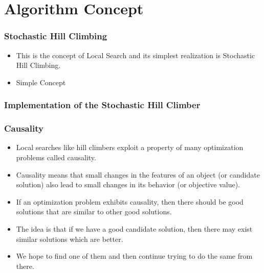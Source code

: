 \documentclass[mathserif]{beamer}%
\begin{document}
\section{Algorithm Concept}%
%
\begin{frame}[t]%
\frametitle{Stochastic Hill Climbing}%
\begin{itemize}%
\item This is the concept of \alert{Local Search}\cite{WGOEB,HS2005SLSFAA,RN2002AI,S2003ITSSAO} and its simplest realization is \alert{Stochastic Hill Climbing}\cite{WGOEB}.%
\item<2-> Simple Concept%
\end{itemize}%
%
\end{frame}%
%
\begin{frame}%
\frametitle{Implementation of the Stochastic Hill Climber}%
%
\end{frame}%
%
\begin{frame}%
\frametitle{Causality}%
\begin{itemize}%
\item Local searches like hill climbers exploit a property of many optimization problems called \alert{causality}\cite{R1973ES,R1994ES,WCT2012EOPABT,WZCN2009WIOD}.%
\item<2-> Causality means that small changes in the features of an object (or candidate solution) also lead to small changes in its behavior (or objective value).%
\item<3-> If an optimization problem exhibits causality, then there should be good solutions that are similar to other good solutions.%
\item<4-> The idea is that if we have a good candidate solution, then there may exist similar solutions which are better.%
\item<5-> We hope to find one of them and then continue trying to do the same from there.%
\end{itemize}%
\end{frame}%
%
\end{document}
